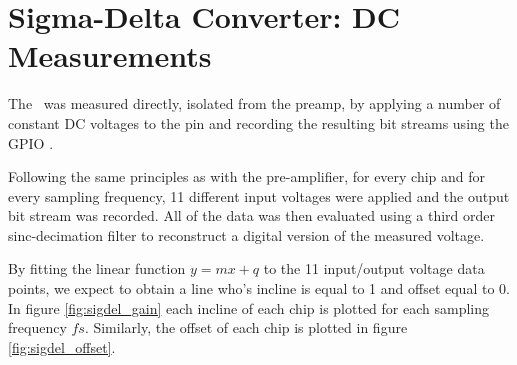 \clearpage
\section{Sigma-Delta Converter: DC Measurements}
\label{sec:sigdelDC}

The \sdm~was measured directly, isolated from the preamp, by applying a number
of  constant  DC  voltages  to  the  pin  and  recording  the
resulting bit streams using the GPIO \raspi.

Following  the  same  principles as with the pre-amplifier, for every chip and
for every sampling frequency, 11 different input voltages were applied and the
output bit  stream  was  recorded.  All of the data was then evaluated using a
third order sinc-decimation filter to reconstruct a  digital  version  of  the
measured voltage.

By fitting the linear function $y=mx+q$ to  the  11  input/output voltage data
points, we expect to obtain a  line  who's  incline  is  equal to 1 and offset
equal to 0. In figure \ref{fig:sigdel_gain}  each  incline  of  each  chip  is
plotted for  each  sampling frequency $fs$. Similarly, the offset of each chip
is plotted in figure \ref{fig:sigdel_offset}.

